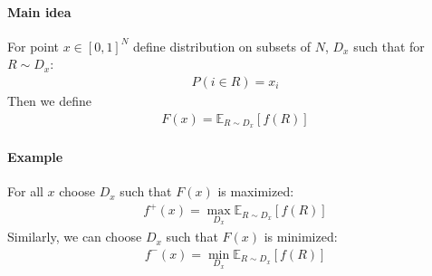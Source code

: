\paragraph{Main idea}
For point $x\in [0,1]^N$ define distribution on subsets of $N$, $D_x$ such that for $R\sim D_x$:
\begin{align}
	P(i \in R) = x_i
\end{align}
Then we define 
\begin{align}
	F(x) = \mathbb{E}_{R\sim D_x} [f(R)]
\end{align}

\paragraph{Example}
For all $x$ choose $D_x$ such that $F(x)$ is maximized:
\begin{align}
f^+(x)  = \max\limits_{D_x}  \mathbb{E}_{R\sim D_x} [f(R)]
\end{align}
Similarly, we can choose $D_x$ such that $F(x)$ is minimized:
\begin{align}
f^-(x)  = \min\limits_{D_x}  \mathbb{E}_{R\sim D_x} [f(R)]
\end{align}

